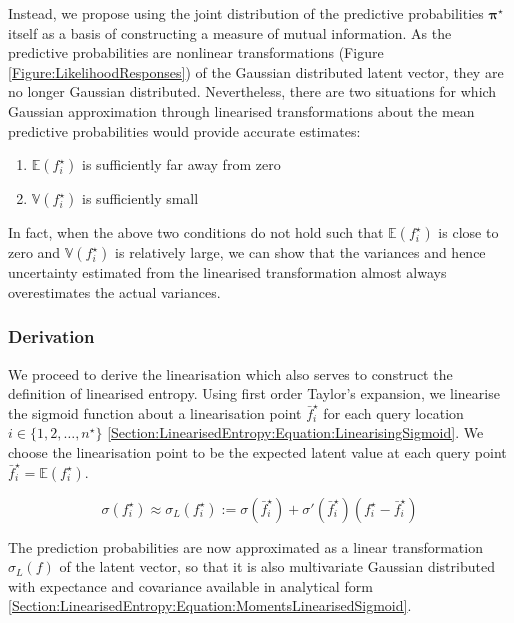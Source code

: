 \documentclass{article}
\renewcommand{\vec}[1]{\boldsymbol{#1}}
\begin{document}
		Instead, we propose using the joint distribution of the predictive probabilities $\vec{\pi^{\star}}$ itself as a basis of constructing a measure of mutual information. As the predictive probabilities are nonlinear transformations (Figure \ref{Figure:LikelihoodResponses}) of the Gaussian distributed latent vector, they are no longer Gaussian distributed. Nevertheless, there are two situations for which Gaussian approximation through linearised transformations about the mean predictive probabilities would provide accurate estimates:
		
		\begin{enumerate}
			\item $\mathbb{E}(f^{\star}_{i})$ is sufficiently far away from zero
			\item $\mathbb{V}(f^{\star}_{i})$ is sufficiently small
		\end{enumerate}
		
		In fact, when the above two conditions do not hold such that $\mathbb{E}(f^{\star}_{i})$ is close to zero and $\mathbb{V}(f^{\star}_{i})$ is relatively large, we can show that the variances and hence uncertainty estimated from the linearised transformation almost always overestimates the actual variances.

		\subsubsection{Derivation}
		
			We proceed to derive the linearisation which also serves to construct the definition of linearised entropy. Using first order Taylor's expansion, we linearise the sigmoid function about a linearisation point $\bar{f}^{\star}_{i}$ for each query location $i \in \{1, 2, \dots, n^{\star}\}$ \eqref{Section:LinearisedEntropy:Equation:LinearisingSigmoid}. We choose the linearisation point to be the expected latent value at each query point $\bar{f}^{\star}_{i} = \mathbb{E}(f^{\star}_{i})$. 
			
			\begin{equation}
				\sigma(f^{\star}_{i}) \approx \sigma_{L}(f^{\star}_{i}) := \sigma(\bar{f}^{\star}_{i}) + \sigma'(\bar{f}^{\star}_{i}) (f^{\star}_{i} - \bar{f}^{\star}_{i})
			\label{Section:LinearisedEntropy:Equation:LinearisingSigmoid}
			\end{equation}
			
			The prediction probabilities are now approximated as a linear transformation $\sigma_{L}(f)$ of the latent vector, so that it is also multivariate Gaussian distributed with expectance and covariance available in analytical form \eqref{Section:LinearisedEntropy:Equation:MomentsLinearisedSigmoid}.
			
\end{document}
